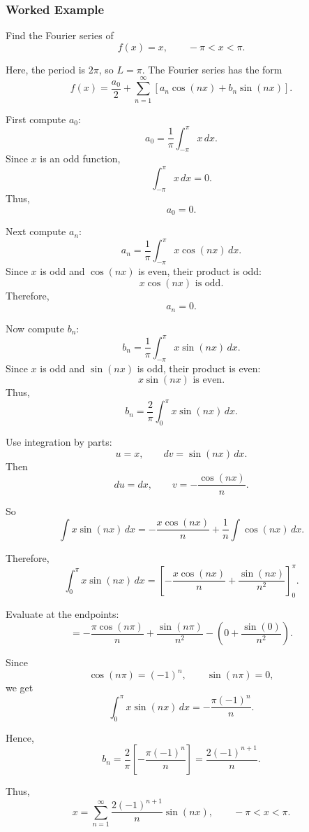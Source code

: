 \subsubsection*{Worked Example}

\begin{examplebox}
    Find the Fourier series of
    \[
        f(x)=x,\qquad -\pi<x<\pi.
    \]

    Here, the period is $2\pi$, so $L=\pi$. The Fourier series has the form
    \[
        f(x)=\frac{a_0}{2}+\sum_{n=1}^{\infty}
        \left[a_n\cos(nx)+b_n\sin(nx)\right].
    \]

    First compute $a_0$:
    \[
        a_0=\frac{1}{\pi}\int_{-\pi}^{\pi}x\,dx.
    \]
    Since $x$ is an odd function,
    \[
        \int_{-\pi}^{\pi}x\,dx=0.
    \]
    Thus,
    \[
        a_0=0.
    \]

    Next compute $a_n$:
    \[
        a_n=\frac{1}{\pi}\int_{-\pi}^{\pi}x\cos(nx)\,dx.
    \]
    Since $x$ is odd and $\cos(nx)$ is even, their product is odd:
    \[
        x\cos(nx)\text{ is odd}.
    \]
    Therefore,
    \[
        a_n=0.
    \]

    Now compute $b_n$:
    \[
        b_n=\frac{1}{\pi}\int_{-\pi}^{\pi}x\sin(nx)\,dx.
    \]
    Since $x$ is odd and $\sin(nx)$ is odd, their product is even:
    \[
        x\sin(nx)\text{ is even}.
    \]
    Thus,
    \[
        b_n=\frac{2}{\pi}\int_0^\pi x\sin(nx)\,dx.
    \]

    Use integration by parts:
    \[
        u=x,\qquad dv=\sin(nx)\,dx.
    \]
    Then
    \[
        du=dx,\qquad v=-\frac{\cos(nx)}{n}.
    \]

    So
    \[
        \int x\sin(nx)\,dx
        =
        -\frac{x\cos(nx)}{n}
        +\frac{1}{n}\int \cos(nx)\,dx.
    \]

    Therefore,
    \[
        \int_0^\pi x\sin(nx)\,dx
        =
        \left[-\frac{x\cos(nx)}{n}
            +\frac{\sin(nx)}{n^2}\right]_0^\pi.
    \]

    Evaluate at the endpoints:
    \[
        =
        -\frac{\pi\cos(n\pi)}{n}
        +\frac{\sin(n\pi)}{n^2}
        -
        \left(0+\frac{\sin(0)}{n^2}\right).
    \]

    Since
    \[
        \cos(n\pi)=(-1)^n,\qquad \sin(n\pi)=0,
    \]
    we get
    \[
        \int_0^\pi x\sin(nx)\,dx
        =
        -\frac{\pi(-1)^n}{n}.
    \]

    Hence,
    \[
        b_n=\frac{2}{\pi}\left[-\frac{\pi(-1)^n}{n}\right]
        =
        \frac{2(-1)^{n+1}}{n}.
    \]

    Thus,
    \[
        x=\sum_{n=1}^{\infty}\frac{2(-1)^{n+1}}{n}\sin(nx),
        \qquad -\pi<x<\pi.
    \]
\end{examplebox}

